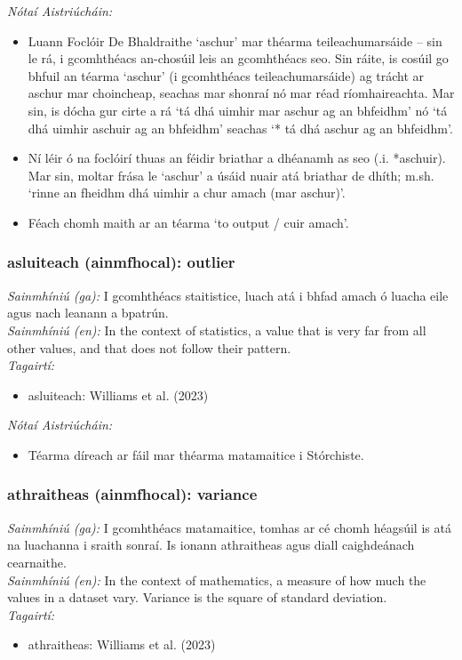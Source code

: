  \noindent \textit{Nótaí Aistriúcháin:}
\begin{itemize}
	\item Luann Foclóir De Bhaldraithe `aschur' mar théarma teileachumarsáide -- sin le rá, i gcomhthéacs an-chosúil leis an gcomhthéacs seo. Sin ráite, is cosúil go bhfuil an téarma `aschur' (i gcomhthéacs teileachumarsáide) ag trácht ar aschur mar choincheap, seachas mar shonraí nó mar réad ríomhaireachta. Mar sin, is dócha gur cirte a rá `tá dhá uimhir mar aschur ag an bhfeidhm' nó `tá dhá uimhir aschuir ag an bhfeidhm' seachas `* tá dhá aschur ag an bhfeidhm'.
	\item Ní léir ó na foclóirí thuas an féidir briathar a dhéanamh as seo (.i. *aschuir). Mar sin, moltar frása le `aschur' a úsáid nuair atá briathar de dhíth; m.sh. `rinne an fheidhm dhá uimhir a chur amach (mar aschur)'.
	\item Féach chomh maith ar an téarma `to output / cuir amach'.
\end{itemize}


\subsubsection*{asluiteach (ainmfhocal): outlier}
 \noindent \textit{Sainmhíniú (ga):} I gcomhthéacs staitistice, luach atá i bhfad amach ó luacha eile agus nach leanann a bpatrún.
\\
 \noindent \textit{Sainmhíniú (en):} In the context of statistics, a value that is very far from all other values, and that does not follow their pattern.
\\
 \noindent \textit{Tagairtí:}
\begin{itemize}
	\item asluiteach: Williams et al. (2023) \cite{storchiste}
\end{itemize}

 \noindent \textit{Nótaí Aistriúcháin:}
\begin{itemize}
	\item Téarma díreach ar fáil mar théarma matamaitice i Stórchiste.
\end{itemize}


\subsubsection*{athraitheas (ainmfhocal): variance}
 \noindent \textit{Sainmhíniú (ga):} I gcomhthéacs matamaitice, tomhas ar cé chomh héagsúil is atá na luachanna i sraith sonraí. Is ionann athraitheas agus diall caighdeánach cearnaithe.
\\
 \noindent \textit{Sainmhíniú (en):} In the context of mathematics, a measure of how much the values in a dataset vary. Variance is the square of standard deviation.
\\
 \noindent \textit{Tagairtí:}
\begin{itemize}
	\item athraitheas: Williams et al. (2023) \cite{storchiste}
\end{itemize}

